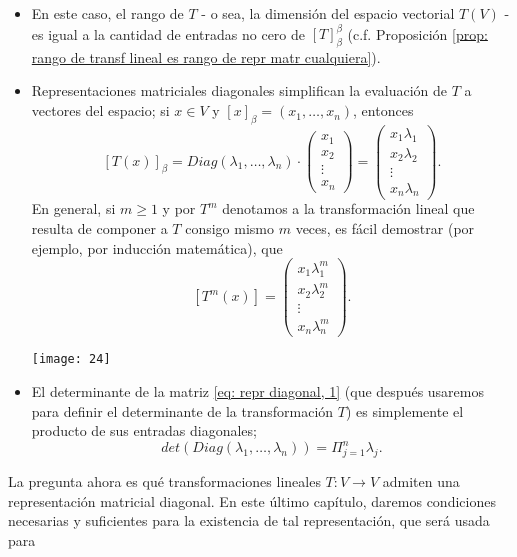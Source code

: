 \begin{itemize}
	\item En este caso, 
	el rango de $T$ - o sea, la dimensión del espacio 
	vectorial $T(V)$ - es igual a la cantidad de entradas no cero
	de $[T]_{\beta}^{\beta}$ (c.f. Proposición 
	\ref{prop: rango de transf lineal es rango de repr matr cualquiera}).
	\item 
	Representaciones matriciales diagonales simplifican la 
	evaluación de $T$ a vectores del espacio; si $x \in V$ y
	$[x]_{\beta} = (x_{1}, \ldots , x_{n})$, entonces
	\[
	[T(x)]_{\beta} = Diag(\lambda_{1}, \ldots , \lambda_{n}) \cdot 
	\begin{pmatrix}
		x_{1} \\
		x_{2} \\
		\vdots \\
		x_{n} 
	\end{pmatrix}
	= \begin{pmatrix}
		x_{1}\lambda_{1} \\
		x_{2} \lambda_{2} \\
		\vdots \\
		x_{n} \lambda_{n}
	\end{pmatrix}.
	\]
	En general, si $m \geq 1$ y por $T^{m}$ 
	denotamos a la transformación lineal que
	resulta de componer a $T$ consigo mismo $m$ veces,
	es fácil demostrar (por ejemplo, por inducción matemática), que 
	\[
	[T^{m}(x)] = 
	\begin{pmatrix}
		x_{1}\lambda_{1}^{m} \\
		x_{2} \lambda_{2}^{m} \\
		\vdots \\
		x_{n} \lambda_{n}^{m}
	\end{pmatrix}.
	\]
	\begin{marginfigure}
		\texttt{[image: 24]} 
	\end{marginfigure}
	\item El determinante de la matriz 
	\eqref{eq: repr diagonal, 1} (que después usaremos para definir el
	determinante de la transformación $T$) es simplemente el producto
	de sus entradas diagonales;
	\[
	det(Diag(\lambda_{1}, \ldots , \lambda_{n}))
	= \Pi_{j = 1}^{n} \lambda_{j}.
	\]
\end{itemize}

La pregunta ahora es qué transformaciones lineales
$T: V \longrightarrow V$ admiten una representación matricial diagonal. 
En este último capítulo, daremos condiciones necesarias y suficientes 
para la existencia de tal representación, que será usada para


